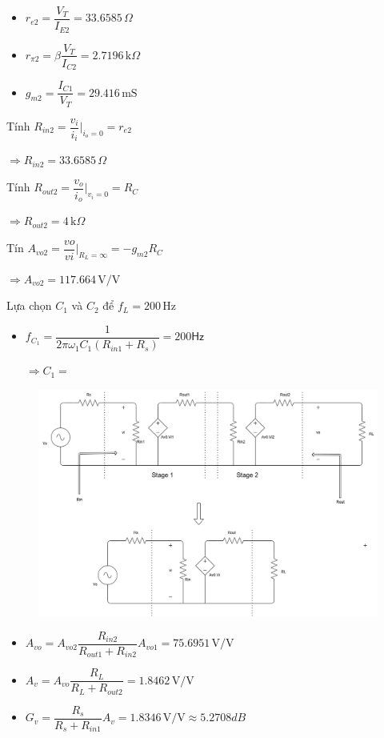 \begin{itemize}[label=-]
	\begin{itemize}[label=+, leftmargin=2cm]
		\item $r_{e2} = \dfrac{V_{T}}{I_{E2}} = 33.6585\,\Omega$
		\item $r_{\pi2} = \beta\dfrac{V_{T}}{I_{C2}} = 2.7196\,\text{k}\Omega$
		\item $g_{m2} = \dfrac{I_{C1}}{V_{T}} = 29.416\,\text{mS}$
	\end{itemize}
	
	Tính $R_{in2} = \dfrac{v_{i}}{i_{i}}|_{i_{o} = 0} = r_{e2}$
	
	$\Rightarrow R_{in2} = 33.6585\,\Omega$
	
	Tính $R_{out2} = \dfrac{v_{o}}{i_{o}}|_{v_{i} = 0} = R_{C}$
	
	$\Rightarrow R_{out2} = 4\,\text{k}\Omega$
	
	Tín $A_{vo2} = \dfrac{vo}{vi}|_{R_{L} = \infty} = -g_{m2} R_{C}$
	
	$\Rightarrow A_{vo2} = 117.664\,\text{V/V}$
\end{itemize}

Lựa chọn $C_{1}$ và $C_{2}$ để $f_{L} = 200\,\text{Hz}$

\begin{itemize}[label=-]
	\item $f_{C_{1}} = \dfrac{1}{2\pi \omega_{1} C_{1	} (R_{in1} + R_{s})} = 200\textsf{Hz}$
	
	$\Rightarrow C_{1} = $
\end{itemize}


\begin{figure}[H]
	\centering
	\includegraphics[width=.9\linewidth]{./my-chapters/my-diagrams/Question5/cauc_all_stage.png}
\end{figure}

\begin{itemize}[label=+, leftmargin=2cm]
	\item $A_{vo} = A_{vo2}\dfrac{R_{in2}}{R_{out1} + R_{in2}} A_{vo1} = 75.6951\,\text{V/V}$
	\item $A_{v} = A_{vo} \dfrac{R_{L}}{R_{L} + R_{out2}} = 1.8462\,\text{V/V}$
	\item $G_{v} = \dfrac{R_{s}}{R_{s} + R_{in1}}A_{v} = 1.8346\,\text{V/V} \approx 5.2708dB$
\end{itemize}

